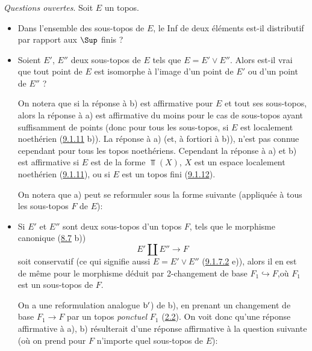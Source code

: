 \setcounter{subsubsection}{13}
\subsubsection{}
\emph{Questions ouvertes}. Soit $E$ un topos.

\begin{itemize}
\item[a)] Dans l'ensemble des sous-topos de $E$, le Inf de deux
éléments est-il distributif par rapport aux $\Sup$ finis ?

\item[b)] Soient $E'$, $E''$ deux sous-topos de $E$ tels que $E=E'\vee
E''$. Alors est-il vrai que tout point de $E$ est isomorphe à
l'image d'un point de $E'$ ou d'un point de $E''$ ?

On notera que si la réponse à b) est affirmative pour $E$ et tout
ses sous-topos, alors la réponse à a) est affirmative du moins pour
le cas de sous-topos ayant suffisamment de points (donc pour tous
les sous-topos, si $E$ est localement noethérien
(\hyperref[IV.exer9.1.11]{9.1.11} b)). La réponse à a) (et, à fortiori à b)),
n'est pas connue cependant pour tous les topos noethériens.
Cependant la réponse à a) et b) est affirmative si $E$ est de la
forme $\Top(X)$, $X$ est un espace localement noethérien
(\hyperref[IV.exer9.1.11]{9.1.11}), ou si $E$ est un topos fini
(\hyperref[IV.exer9.1.12]{9.1.12}).

On notera que a) peut se reformuler sous la forme suivante
(appliquée à tous les sous-topos $F$ de $E$):

\item[$\rm a'$)] Si $E'$ et $E''$ sont deux sous-topos d'un topos $F$,
tels que le morphisme canonique (\cf \hyperref[IV.exer8.7]{8.7} b))
\begin{equation*}
E'\amalg E''\longrightarrow F\tag{9.1.14.1}
\end{equation*}
soit conservatif (ce qui signifie aussi $E=E'\vee E''$
(\hyperref[IV.exer9.1.7.2]{9.1.7.2} e)), alors il en est de même pour le morphisme
déduit par 2-changement de base $F_1\hookrightarrow
F$,\pageoriginale où $F_1$ est un sous-topos de $F$.

On a une reformulation analogue $\rm b'$) de b), en prenant un
changement de base $F_1\rightarrow F$ par un topos \emph{ponctuel}
$F_1$ (\hyperref[IV.subsec2.2]{2.2}). On voit donc qu'une réponse affirmative
à a), b) résulterait d'une réponse affirmative à la question
suivante (où on prend pour $F$ n'importe quel sous-topos de $E$):


\end{itemize}
